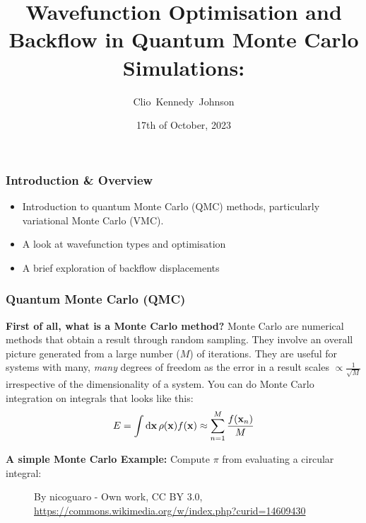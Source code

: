 \documentclass[10pt]{beamer}
\title[Optimisation and Backflow]{Wavefunction Optimisation and Backflow in Quantum Monte Carlo Simulations:}
\subtitle{}
\author[Clio Johnson]{Clio~Kennedy~Johnson}
\date[2023-10-17]{17th of October, 2023}
\begin{document}
\begin{frame}
    \titlepage%
\end{frame}


\begin{frame}
    \frametitle{Introduction \& Overview}
    \begin{itemize}
        \item[\textbullet] Introduction to quantum Monte Carlo (QMC) methods, particularly variational Monte Carlo (VMC).
        \item[\textbullet] A look at wavefunction types and optimisation
        \item[\textbullet] A brief exploration of backflow displacements
    \end{itemize}
\end{frame}


\begin{frame}[allowframebreaks]
    \frametitle{Quantum Monte Carlo (QMC)}
    \textbf{First of all, what is a Monte Carlo method?}\medskip\newline
    Monte Carlo are numerical methods that obtain a result through random sampling. They involve an overall picture generated from a large number ($M$) of iterations.\medskip\newline
    They are useful for systems with many, \textit{many} degrees of freedom as the error in a result scales $\propto\frac{1}{\sqrt{M}}$ irrespective of the dimensionality of a system.\medskip\newline %
    You can do Monte Carlo integration on integrals that looks like this:
    \begin{equation}
        E = \int\dd{\vb{x}}\rho\pqty{\vb{x}}f\pqty{\vb{x}}
        \approx\sum_{n=1}^{M}\frac{f\pqty{\vb{x}_n}}{M}
    \end{equation}
    \framebreak%

    \textbf{A simple Monte Carlo Example:}\medskip\newline
    Compute $\pi$ from evaluating a circular integral:
    \begin{figure}
        \centering
        \caption{%
            By nicoguaro - Own work, CC BY 3.0,
            \url{https://commons.wikimedia.org/w/index.php?curid=14609430}
        }
    \end{figure}
    \framebreak%


\end{frame}
\end{document}

